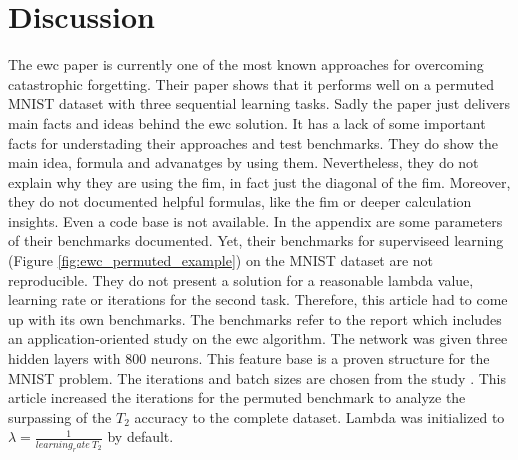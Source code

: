 \chapter{Discussion}

The \acrshort{ewc} paper is currently one of the most known approaches for overcoming catastrophic forgetting.
Their paper shows that it performs well on a permuted MNIST dataset with three sequential learning tasks.
\newline
Sadly the paper just delivers main facts and ideas behind the \acrshort{ewc} solution.
It has a lack of some important facts for understading their approaches and test benchmarks.
They do show the main idea, formula and advanatges by using them.
Nevertheless, they do not explain why they are using the \acrshort{fim}, in fact just the diagonal of the \acrshort{fim}.
Moreover, they do not documented helpful formulas, like the \acrshort{fim} or deeper calculation insights.
Even a code base is not available.
In the appendix are some parameters of their benchmarks documented.
Yet, their benchmarks for superviseed learning (Figure \ref{fig:ewc_permuted_example}) on the MNIST dataset are not reproducible.
They do not present a solution for a reasonable lambda value, learning rate or iterations for the second task.
Therefore, this article had to come up with its own benchmarks.
The benchmarks refer to the report \cite{cf_application_oriented_study} which includes an application-oriented study on the \acrshort{ewc} algorithm.
The network was given three hidden layers with 800 neurons.
This feature base is a proven structure for the MNIST problem.
The iterations and batch sizes are chosen from the study \cite{cf_application_oriented_study}.
This article increased the iterations for the permuted benchmark to analyze the surpassing of the $T_2$ accuracy to the complete dataset.
Lambda was initialized to $\lambda = \frac{1}{learning_rate \: T_2}$ by default.


